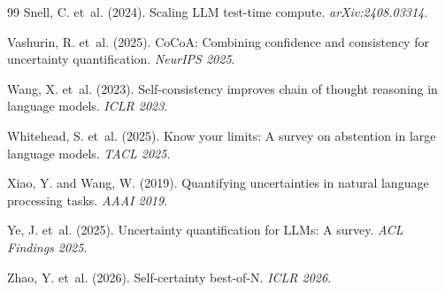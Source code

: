 \documentclass[11pt,twocolumn]{article}
\begin{document}
{\begin{thebibliography}{99}
Snell, C. et~al. (2024).
Scaling {LLM} test-time compute.
\textit{arXiv:2408.03314}.

Vashurin, R. et~al. (2025).
{CoCoA}: Combining confidence and consistency for uncertainty quantification.
\textit{NeurIPS 2025}.

Wang, X. et~al. (2023).
Self-consistency improves chain of thought reasoning in language models.
\textit{ICLR 2023}.

Whitehead, S. et~al. (2025).
Know your limits: A survey on abstention in large language models.
\textit{TACL 2025}.

Xiao, Y. and Wang, W. (2019).
Quantifying uncertainties in natural language processing tasks.
\textit{AAAI 2019}.

Ye, J. et~al. (2025).
Uncertainty quantification for {LLMs}: A survey.
\textit{ACL Findings 2025}.

Zhao, Y. et~al. (2026).
Self-certainty best-of-{N}.
\textit{ICLR 2026}.

\end{thebibliography}
}
\end{document}
